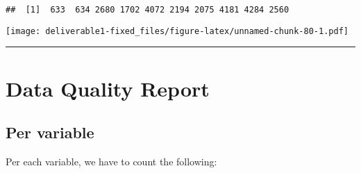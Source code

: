 \documentclass[
  18pt,
  a4paper]{article}
\newenvironment{Shaded}{\begin{snugshade}}{\end{snugshade}}
\newcommand{\DataTypeTok}[1]{\textcolor[rgb]{0.13,0.29,0.53}{#1}}
\newcommand{\DecValTok}[1]{\textcolor[rgb]{0.00,0.00,0.81}{#1}}
\newcommand{\KeywordTok}[1]{\textcolor[rgb]{0.13,0.29,0.53}{\textbf{#1}}}
\newcommand{\NormalTok}[1]{#1}
\newcommand{\OperatorTok}[1]{\textcolor[rgb]{0.81,0.36,0.00}{\textbf{#1}}}
\newcommand{\OtherTok}[1]{\textcolor[rgb]{0.56,0.35,0.01}{#1}}
\newcommand{\StringTok}[1]{\textcolor[rgb]{0.31,0.60,0.02}{#1}}
\begin{document}
\begin{verbatim}
##  [1]  633  634 2680 1702 4072 2194 2075 4181 4284 2560
\end{verbatim}

\begin{Shaded}
\end{Shaded}

\texttt{[image: deliverable1-fixed\_files/figure-latex/unnamed-chunk-80-1.pdf]}

\begin{Shaded}
\end{Shaded}

\begin{center}\rule{0.5\linewidth}{0.5pt}\end{center}

\hypertarget{data-quality-report}{%
\section{Data Quality Report}\label{data-quality-report}}

\hypertarget{per-variable}{%
\subsection{Per variable}\label{per-variable}}

Per each variable, we have to count the following:
\end{document}
